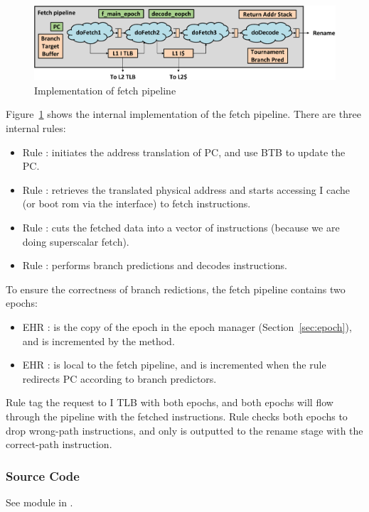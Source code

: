\begin{figure}
    \centering
    \includegraphics[width=\columnwidth]{fig/fetch_crop.pdf}
    \caption{Implementation of fetch pipeline}\label{fig:fetch-impl}
\end{figure}

Figure~\ref{fig:fetch-impl} shows the internal implementation of the fetch pipeline.
There are three internal rules:
\begin{itemize}
    \item Rule : initiates the address translation of PC, and use BTB to update the PC.
    \item Rule : retrieves the translated physical address and starts accessing I cache (or boot rom via the  interface) to fetch instructions.
    \item Rule : cuts the fetched data into a vector of instructions (because we are doing superscalar fetch).
    \item Rule : performs branch predictions and decodes instructions.
\end{itemize}
To ensure the correctness of branch redictions, the fetch pipeline contains two epochs:
\begin{itemize}
    \item EHR : is the copy of the epoch in the epoch manager (Section~\ref{sec:epoch}), and is incremented by the  method.
    \item EHR : is local to the fetch pipeline, and is incremented when the  rule redirects PC according to branch predictors.
\end{itemize}
Rule  tag the request to I TLB with both epochs, and both epochs will flow through the pipeline with the fetched instructions.
Rule  checks both epochs to drop wrong-path instructions, and only  is outputted to the rename stage with the correct-path instruction.

\subsubsection{Source Code}
See module  in .

